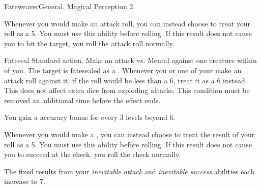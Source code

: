     \begin{feat}{Fateweaver}{General, Magical}
        \featpre Perception 2.

         Whenever you would make an attack roll, you can instead choose to treat your roll as a 5.
        You must use this ability before rolling.
        If this result does not cause you to hit the target, you roll the attack roll normally.

        \begin{magicalactiveability}{Fateseal}
            \abilityusagetime Standard action.
            \rankline
            Make an attack vs. Mental against one creature within \medrange of you.
            \hit The target is fatesealed as a .
            Whenever you or one of your  make an attack roll against it, if the roll would be less than a 6, treat it as a 6 instead.
            This does not affect extra dice from exploding attacks.
            \crit This condition must be removed an additional time before the effect ends.

            \rankline
            You gain a  accuracy bonus for every 3 levels beyond 6.
        \end{magicalactiveability}

         Whenever you would make a , you can instead choose to treat the result of your roll as a 5.
        You must use this ability before rolling.
        If this result does not cause you to succeed at the check, you roll the check normally.

         The fixed results from your \textit{inevitable attack} and \textit{inevitable success} abilities each increase to 7.
    \end{feat}



